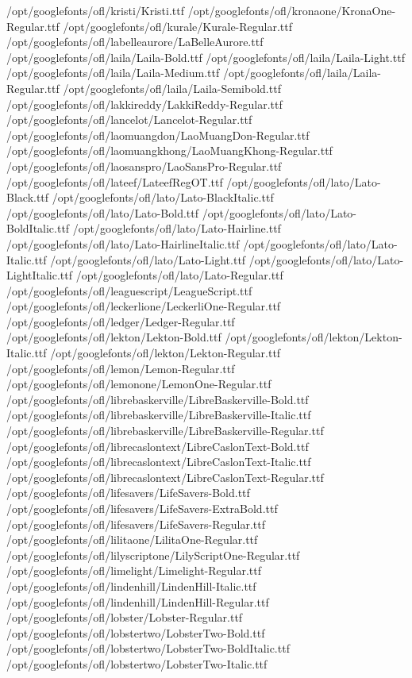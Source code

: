 /opt/googlefonts/ofl/kristi/Kristi.ttf
/opt/googlefonts/ofl/kronaone/KronaOne-Regular.ttf
/opt/googlefonts/ofl/kurale/Kurale-Regular.ttf
/opt/googlefonts/ofl/labelleaurore/LaBelleAurore.ttf
/opt/googlefonts/ofl/laila/Laila-Bold.ttf
/opt/googlefonts/ofl/laila/Laila-Light.ttf
/opt/googlefonts/ofl/laila/Laila-Medium.ttf
/opt/googlefonts/ofl/laila/Laila-Regular.ttf
/opt/googlefonts/ofl/laila/Laila-Semibold.ttf
/opt/googlefonts/ofl/lakkireddy/LakkiReddy-Regular.ttf
/opt/googlefonts/ofl/lancelot/Lancelot-Regular.ttf
/opt/googlefonts/ofl/laomuangdon/LaoMuangDon-Regular.ttf
/opt/googlefonts/ofl/laomuangkhong/LaoMuangKhong-Regular.ttf
/opt/googlefonts/ofl/laosanspro/LaoSansPro-Regular.ttf
/opt/googlefonts/ofl/lateef/LateefRegOT.ttf
/opt/googlefonts/ofl/lato/Lato-Black.ttf
/opt/googlefonts/ofl/lato/Lato-BlackItalic.ttf
/opt/googlefonts/ofl/lato/Lato-Bold.ttf
/opt/googlefonts/ofl/lato/Lato-BoldItalic.ttf
/opt/googlefonts/ofl/lato/Lato-Hairline.ttf
/opt/googlefonts/ofl/lato/Lato-HairlineItalic.ttf
/opt/googlefonts/ofl/lato/Lato-Italic.ttf
/opt/googlefonts/ofl/lato/Lato-Light.ttf
/opt/googlefonts/ofl/lato/Lato-LightItalic.ttf
/opt/googlefonts/ofl/lato/Lato-Regular.ttf
/opt/googlefonts/ofl/leaguescript/LeagueScript.ttf
/opt/googlefonts/ofl/leckerlione/LeckerliOne-Regular.ttf
/opt/googlefonts/ofl/ledger/Ledger-Regular.ttf
/opt/googlefonts/ofl/lekton/Lekton-Bold.ttf
/opt/googlefonts/ofl/lekton/Lekton-Italic.ttf
/opt/googlefonts/ofl/lekton/Lekton-Regular.ttf
/opt/googlefonts/ofl/lemon/Lemon-Regular.ttf
/opt/googlefonts/ofl/lemonone/LemonOne-Regular.ttf
/opt/googlefonts/ofl/librebaskerville/LibreBaskerville-Bold.ttf
/opt/googlefonts/ofl/librebaskerville/LibreBaskerville-Italic.ttf
/opt/googlefonts/ofl/librebaskerville/LibreBaskerville-Regular.ttf
/opt/googlefonts/ofl/librecaslontext/LibreCaslonText-Bold.ttf
/opt/googlefonts/ofl/librecaslontext/LibreCaslonText-Italic.ttf
/opt/googlefonts/ofl/librecaslontext/LibreCaslonText-Regular.ttf
/opt/googlefonts/ofl/lifesavers/LifeSavers-Bold.ttf
/opt/googlefonts/ofl/lifesavers/LifeSavers-ExtraBold.ttf
/opt/googlefonts/ofl/lifesavers/LifeSavers-Regular.ttf
/opt/googlefonts/ofl/lilitaone/LilitaOne-Regular.ttf
/opt/googlefonts/ofl/lilyscriptone/LilyScriptOne-Regular.ttf
/opt/googlefonts/ofl/limelight/Limelight-Regular.ttf
/opt/googlefonts/ofl/lindenhill/LindenHill-Italic.ttf
/opt/googlefonts/ofl/lindenhill/LindenHill-Regular.ttf
/opt/googlefonts/ofl/lobster/Lobster-Regular.ttf
/opt/googlefonts/ofl/lobstertwo/LobsterTwo-Bold.ttf
/opt/googlefonts/ofl/lobstertwo/LobsterTwo-BoldItalic.ttf
/opt/googlefonts/ofl/lobstertwo/LobsterTwo-Italic.ttf
